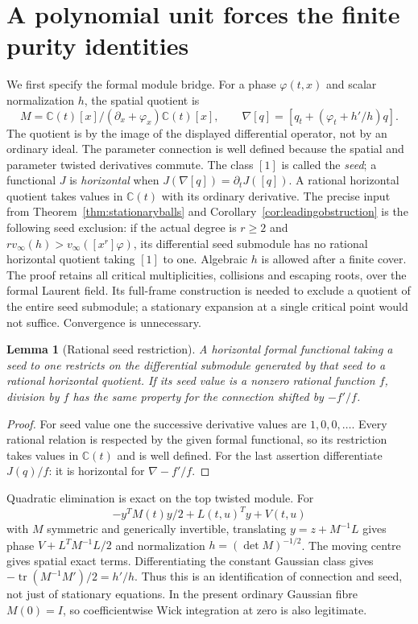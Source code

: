 \documentclass[11pt]{article}
\newtheorem{lemma}[theorem]{Lemma}
\theoremstyle{definition}\newtheorem{definition}[theorem]{Definition}
\theoremstyle{remark}\newtheorem{remark}[theorem]{Remark}
\newcommand{\C}{\mathbb C}
\begin{document}
\section{A polynomial unit forces the finite purity identities}

We first specify the formal module bridge. For a phase $\varphi(t,x)$
and scalar normalization $h$, the spatial quotient is
\[
 M=\C(t)[x]/(\partial_x+\varphi_x)\C(t)[x],\qquad
 \nabla[q]=[q_t+(\varphi_t+h'/h)q].
\]
The quotient is by the image of the displayed differential operator,
not by an ordinary ideal. The parameter connection is well defined because
the spatial and parameter twisted derivatives commute. The class $[1]$
is called the \emph{seed}; a functional $J$ is \emph{horizontal} when
$J(\nabla[q])=\partial_tJ([q])$. A rational horizontal quotient takes
values in $\C(t)$ with its ordinary derivative.
The precise input from Theorem~\ref{thm:stationaryballs} and
Corollary~\ref{cor:leadingobstruction} is the following seed exclusion:
if the actual degree is $r\ge2$ and
$r v_\infty(h)>v_\infty([x^r]\varphi)$, its differential seed
submodule has no rational horizontal quotient taking $[1]$ to one.
Algebraic $h$ is allowed after a finite cover. The proof retains
all critical multiplicities, collisions and escaping roots, over the
formal Laurent field. Its full-frame construction is needed to exclude
a quotient of the entire seed submodule; a stationary expansion at a
single critical point would not suffice. Convergence is unnecessary.

\begin{lemma}[Rational seed restriction]\label{lem:seedfunctional}
A horizontal formal functional taking a seed to one restricts on
the differential submodule generated by that seed to a rational
horizontal quotient. If its seed value is a nonzero rational
function $f$, division by $f$ has the same property for the
connection shifted by $-f'/f$.
\end{lemma}
\begin{proof}
For seed value one the successive derivative values are
$1,0,0,\ldots$. Every rational relation is respected by the
given formal functional, so its restriction takes values in
$\C(t)$ and is well defined. For the last assertion differentiate
$J(q)/f$: it is horizontal for $\nabla-f'/f$.
\end{proof}

Quadratic elimination is exact on the top twisted module. For
\[
 -y^TM(t)y/2+L(t,u)^Ty+V(t,u)
\]
with $M$ symmetric and generically invertible, translating
$y=z+M^{-1}L$ gives phase $V+L^TM^{-1}L/2$ and normalization
$h=(\det M)^{-1/2}$. The moving centre gives spatial exact
terms. Differentiating the constant Gaussian class gives
$-\operatorname{tr}(M^{-1}M')/2=h'/h$. Thus this is an
identification of connection and seed, not just of stationary
equations. In the present ordinary Gaussian fibre $M(0)=I$,
so coefficientwise Wick integration at zero is also legitimate.
\end{document}
